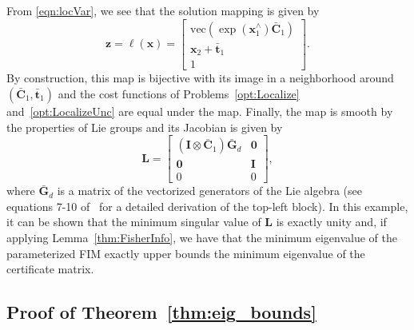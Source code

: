 \documentclass[lettersize,journal]{IEEEtran}
\newcommand{\vect}[1]{\mbox{vec}(#1)}
\begin{document}
From \eqref{eqn:locVar}, we see that the solution mapping is given by
\begin{equation}
	\bm{z}=\bm{\ell}(\bm{x}) = \begin{bmatrix}
		\vect{\exp(\bm{x}_1^\wedge)\bar{\bm{C}}_1}\\ \bm{x}_2 + \bar{\bm{t}}_1 \\ 1
	\end{bmatrix}.
\end{equation}
By construction, this map is bijective with its image in a neighborhood around $(\bar{\bm{C}}_1, \bar{\bm{t}}_1)$ and the cost functions of Problems~\eqref{opt:Localize} and~\eqref{opt:LocalizeUnc} are equal under the map. Finally, the map is smooth by the properties of Lie groups and its Jacobian is given by
\begin{equation}
	\bm{L} = \begin{bmatrix}
		(\bm{I}\otimes\bar{\bm{C}}_1) \bar{\bm{G}}_d & \bm{0}\\
		\bm{0} & \bm{I}\\
		0 & 0
	\end{bmatrix},
\end{equation}
where $\bar{\bm{G}}_d$ is a matrix of the vectorized generators of the Lie algebra (see equations 7-10 of~\cite{dellaertShonanRotationAveraging2020} for a detailed derivation of the top-left block). In this example, it can be shown that the minimum singular value of $\bm{L}$ is exactly unity and, if applying Lemma~\ref{thm:FisherInfo}, we have that the minimum eigenvalue of the parameterized FIM exactly upper bounds the minimum eigenvalue of the certificate matrix.

\subsection{Proof of Theorem~\ref{thm:eig_bounds}}\label{App:prop1Proof}
\end{document}
